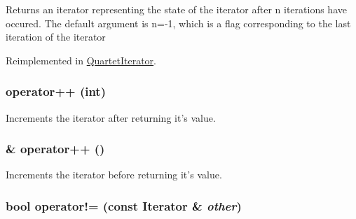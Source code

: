 Returns an iterator representing the state of the iterator after n iterations have occured. The default argument is n=-\/1, which is a flag corresponding to the last iteration of the iterator 

Reimplemented in \hyperlink{classJKBuilder_1_1QuartetIterator_a5f692b73d2e160450f4617bb75825e11}{QuartetIterator}.\hypertarget{classJKBuilder_1_1Iterator_ac1702aedba13b4112b891b58dfd78eba}{
\subsubsection[{operator++}]{ operator++ (int)}}
\label{classJKBuilder_1_1Iterator_ac1702aedba13b4112b891b58dfd78eba}


Increments the iterator after returning it's value. \hypertarget{classJKBuilder_1_1Iterator_ae1f21c74128a5ef5d1b9de72ceb09be8}{
\subsubsection[{operator++}]{ \& operator++ ()}}
\label{classJKBuilder_1_1Iterator_ae1f21c74128a5ef5d1b9de72ceb09be8}


Increments the iterator before returning it's value. \hypertarget{classJKBuilder_1_1Iterator_a8c06af8ae0d9d1614ae9f81629275926}{
\subsubsection[{operator!=}]{\setlength{\rightskip}{0pt plus 5cm}bool operator!= (const {\bf Iterator} \& {\em other})}}
\label{classJKBuilder_1_1Iterator_a8c06af8ae0d9d1614ae9f81629275926}


